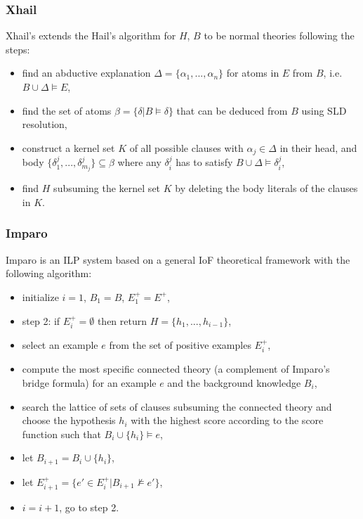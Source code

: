 \subsubsection{Xhail\cite{kimber2012learning}\cite{ray2005phdHybrid}\cite{corapi2011nonmonotonic}}
Xhail's extends the Hail's algorithm for $H$, $B$ to be normal theories following the steps:
\begin{itemize}
\item find an abductive explanation $\Delta=\{\alpha_1, ..., \alpha_n\}$ for atoms in $E$ from $B$, i.e. $B \cup \Delta \models E$,
\item find the set of atoms $\beta=\{\delta | B \models \delta\}$ that can be deduced from $B$ using SLD resolution,
\item construct a kernel set $K$ of all possible clauses with $\alpha_j \in \Delta$ in their head, and body $\{\delta^j_1, ..., \delta^j_{m_j}\} \subseteq \beta$ where any $\delta^j_i$ has to satisfy $B \cup \Delta \models \delta^j_i$,
\item find $H$ subsuming the kernel set $K$ by deleting the body literals of the clauses in $K$.
\end{itemize}

\subsubsection{Imparo}
Imparo is an ILP system based on a general IoF theoretical framework with the following algorithm:
\begin{itemize}
\item initialize $i=1$, $B_1=B$, $E^+_1=E^+$,
\item step 2: if $E^+_i = \emptyset$ then return $H=\{h_1, ..., h_{i-1}\}$,
\item select an example $e$ from the set of positive examples $E^+_i$,
\item compute the most specific connected theory (a complement of Imparo's bridge formula) for an example $e$ and the background knowledge $B_i$,
\item search the lattice of sets of clauses subsuming the connected theory and choose the hypothesis $h_i$ with the highest score according to the score function such that $B_i \cup \{h_i\} \models e$,
\item let $B_{i+1}=B_i \cup \{h_i\}$,
\item let $E^+_{i+1}=\{e' \in E^+_i | B_{i+1} \not\models e'\}$,
\item $i=i+1$, go to step 2.
\end{itemize}


